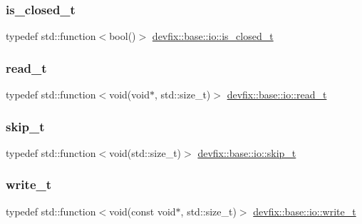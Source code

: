 \subsubsection{\texorpdfstring{is\+\_\+closed\+\_\+t}{is\_closed\_t}}
{\footnotesize\ttfamily typedef std\+::function$<$bool()$>$ \hyperlink{namespacedevfix_1_1base_1_1io_a14f89d4437ced6ede49c044ee8e71f17}{devfix\+::base\+::io\+::is\+\_\+closed\+\_\+t}}

\mbox{\label{namespacedevfix_1_1base_1_1io_ae311e0a7c5c8f064e222933e152aff64}} 
\subsubsection{\texorpdfstring{read\+\_\+t}{read\_t}}
{\footnotesize\ttfamily typedef std\+::function$<$void(void$\ast$, std\+::size\+\_\+t)$>$ \hyperlink{namespacedevfix_1_1base_1_1io_ae311e0a7c5c8f064e222933e152aff64}{devfix\+::base\+::io\+::read\+\_\+t}}

\mbox{\label{namespacedevfix_1_1base_1_1io_aeb8f94d85cfeaa405f53a6967e609645}} 
\subsubsection{\texorpdfstring{skip\+\_\+t}{skip\_t}}
{\footnotesize\ttfamily typedef std\+::function$<$void(std\+::size\+\_\+t)$>$ \hyperlink{namespacedevfix_1_1base_1_1io_aeb8f94d85cfeaa405f53a6967e609645}{devfix\+::base\+::io\+::skip\+\_\+t}}

\mbox{\label{namespacedevfix_1_1base_1_1io_aaa3124cddb420001b0296561c60f8fcd}} 
\subsubsection{\texorpdfstring{write\+\_\+t}{write\_t}}
{\footnotesize\ttfamily typedef std\+::function$<$void(const void$\ast$, std\+::size\+\_\+t)$>$ \hyperlink{namespacedevfix_1_1base_1_1io_aaa3124cddb420001b0296561c60f8fcd}{devfix\+::base\+::io\+::write\+\_\+t}}



